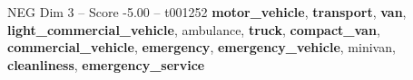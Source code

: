 \begin{textsample}{NEG Dim 3 – Score -5.00 – t001252}  \label{ex:f3_neg_030}
\textbf{motor\_vehicle}, \textbf{transport}, \textbf{van}, \textbf{light\_commercial\_vehicle}, ambulance, \textbf{truck}, \textbf{compact\_van}, \textbf{commercial\_vehicle}, \textbf{emergency}, \textbf{emergency\_vehicle}, minivan, \textbf{cleanliness}, \textbf{emergency\_service}

\end{textsample}
